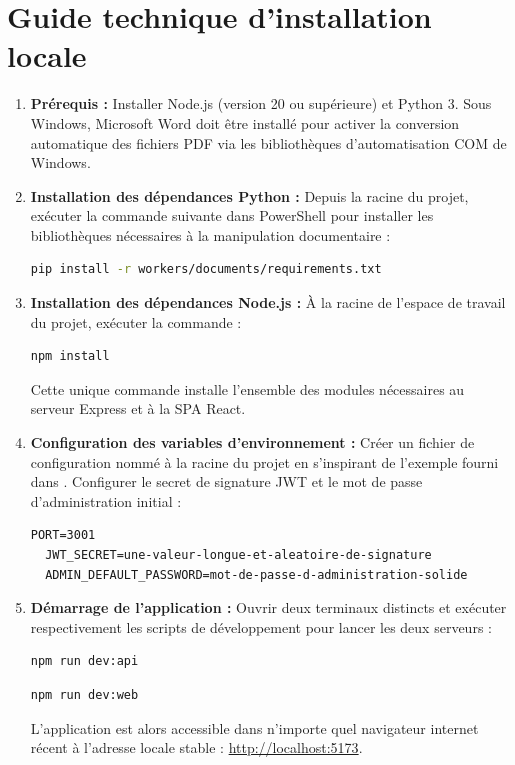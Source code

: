 \documentclass[12pt,a4paper,oneside]{report}
\newcommand{\sourcefile}[1]{\path{#1}}
\begin{document}
\chapter{Guide technique d'installation locale}
\begin{enumerate}
  \item \textbf{Prérequis :} Installer Node.js (version 20 ou supérieure) et Python 3. Sous Windows, Microsoft Word doit être installé pour activer la conversion automatique des fichiers PDF via les bibliothèques d'automatisation COM de Windows.
  \item \textbf{Installation des dépendances Python :} Depuis la racine du projet, exécuter la commande suivante dans PowerShell pour installer les bibliothèques nécessaires à la manipulation documentaire :
  \begin{lstlisting}[language=bash]
  pip install -r workers/documents/requirements.txt
  \end{lstlisting}
  \item \textbf{Installation des dépendances Node.js :} À la racine de l'espace de travail du projet, exécuter la commande :
  \begin{lstlisting}[language=bash]
  npm install
  \end{lstlisting}
  Cette unique commande installe l'ensemble des modules nécessaires au serveur Express et à la SPA React.
  \item \textbf{Configuration des variables d'environnement :} Créer un fichier de configuration nommé \sourcefile{.env} à la racine du projet en s'inspirant de l'exemple fourni dans \sourcefile{.env.example}. Configurer le secret de signature JWT et le mot de passe d'administration initial :
  \begin{lstlisting}[caption={Exemple de fichier .env standard}]
  PORT=3001
  JWT_SECRET=une-valeur-longue-et-aleatoire-de-signature
  ADMIN_DEFAULT_PASSWORD=mot-de-passe-d-administration-solide
  \end{lstlisting}
  \clearpage
  \item \textbf{Démarrage de l'application :} Ouvrir deux terminaux distincts et exécuter respectivement les scripts de développement pour lancer les deux serveurs :
  \begin{lstlisting}[language=bash,caption={Lancement du serveur API Express (Terminal 1)}]
  npm run dev:api
  \end{lstlisting}
  \begin{lstlisting}[language=bash,caption={Lancement du compilateur Vite 6 (Terminal 2)}]
  npm run dev:web
  \end{lstlisting}
  L'application est alors accessible dans n'importe quel navigateur internet récent à l'adresse locale stable : \url{http://localhost:5173}.
\end{enumerate}
\end{document}
